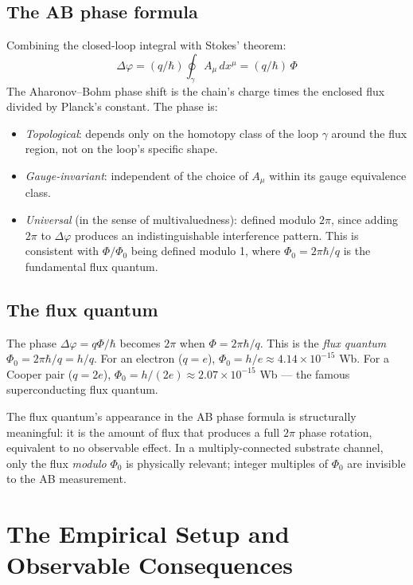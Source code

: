 \documentclass[11pt,a4paper]{article}
\begin{document}
\subsection{The AB phase formula}

Combining the closed-loop integral with Stokes' theorem:
\[
\Delta \varphi = (q/\hbar) \oint_\gamma A_\mu \, dx^\mu = (q/\hbar) \, \Phi
\]
The Aharonov--Bohm phase shift is the chain's charge times the enclosed flux divided by Planck's constant. The phase is:

\begin{itemize}[noitemsep]
  \item \emph{Topological}: depends only on the homotopy class of the loop $\gamma$ around the flux region, not on the loop's specific shape.
  \item \emph{Gauge-invariant}: independent of the choice of $A_\mu$ within its gauge equivalence class.
  \item \emph{Universal} (in the sense of multivaluedness): defined modulo $2\pi$, since adding $2\pi$ to $\Delta\varphi$ produces an indistinguishable interference pattern. This is consistent with $\Phi/\Phi_0$ being defined modulo 1, where $\Phi_0 = 2\pi\hbar/q$ is the fundamental flux quantum.
\end{itemize}

\subsection{The flux quantum}

The phase $\Delta\varphi = q\Phi/\hbar$ becomes $2\pi$ when $\Phi = 2\pi\hbar/q$. This is the \emph{flux quantum} $\Phi_0 = 2\pi\hbar/q = h/q$. For an electron ($q = e$), $\Phi_0 = h/e \approx 4.14 \times 10^{-15}$ Wb. For a Cooper pair ($q = 2e$), $\Phi_0 = h/(2e) \approx 2.07 \times 10^{-15}$ Wb --- the famous superconducting flux quantum.

The flux quantum's appearance in the AB phase formula is structurally meaningful: it is the amount of flux that produces a full $2\pi$ phase rotation, equivalent to no observable effect. In a multiply-connected substrate channel, only the flux \emph{modulo} $\Phi_0$ is physically relevant; integer multiples of $\Phi_0$ are invisible to the AB measurement.

\section{The Empirical Setup and Observable Consequences}
\end{document}
